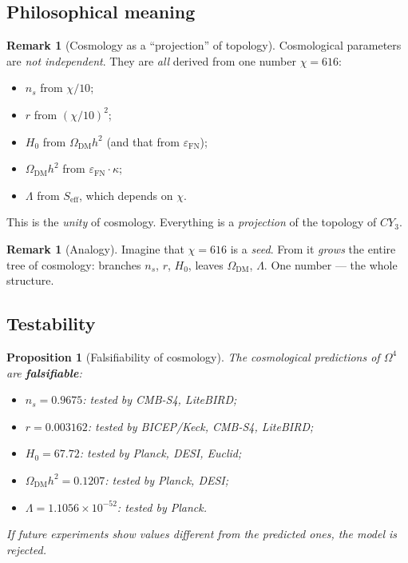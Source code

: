 \documentclass[11pt,a4paper]{article}
\newcommand{\CY}{CY_3}
\newcommand{\Om}{\Omega^4}
\newcommand{\epsFN}{\varepsilon_{\text{FN}}}
\newtheorem{proposition}[theorem]{Proposition}
\theoremstyle{definition}
\newtheorem{remark}[theorem]{Remark}
\begin{document}
\subsection{Philosophical meaning}
\label{subsec:cosmology-philosophy}

\begin{remark}[Cosmology as a ``projection'' of topology]
\label{rem:cosmology-projection}
Cosmological parameters are \emph{not independent}. They 
are \emph{all} derived from one number $\chi = 616$:
\begin{itemize}
    \item $n_s$ from $\chi/10$;
    \item $r$ from $(\chi/10)^2$;
    \item $H_0$ from $\Omega_{\text{DM}} h^2$ (and that from $\epsFN$);
    \item $\Omega_{\text{DM}} h^2$ from $\epsFN \cdot \kappa$;
    \item $\Lambda$ from $S_{\text{eff}}$, which depends on $\chi$.
\end{itemize}
This is the \emph{unity} of cosmology. Everything is a \emph{projection} 
of the topology of $\CY$.
\end{remark}

\begin{remark}[Analogy]
\label{rem:cosmology-analogy}
Imagine that $\chi = 616$ is a \emph{seed}. From it 
\emph{grows} the entire tree of cosmology: branches $n_s$, $r$, 
$H_0$, leaves $\Omega_{\text{DM}}$, $\Lambda$. 
One number — the whole structure.
\end{remark}

\subsection{Testability}
\label{subsec:cosmology-testability}

\begin{proposition}[Falsifiability of cosmology]
\label{prop:cosmology-falsifiable}
The cosmological predictions of $\Om$ are \textbf{falsifiable}:
\begin{itemize}
    \item $n_s = 0.9675$: tested by CMB-S4, LiteBIRD;
    \item $r = 0.003162$: tested by BICEP/Keck, CMB-S4, LiteBIRD;
    \item $H_0 = 67.72$: tested by Planck, DESI, Euclid;
    \item $\Omega_{\text{DM}} h^2 = 0.1207$: tested 
          by Planck, DESI;
    \item $\Lambda = 1.1056 \times 10^{-52}$: tested by Planck.
\end{itemize}
If future experiments show values different from 
the predicted ones, the model is rejected.
\end{proposition}
\end{document}
